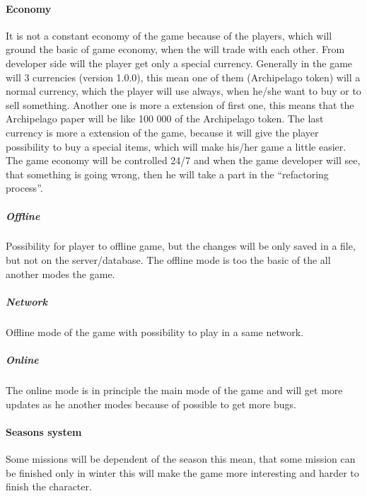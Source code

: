 \documentclass[parskip=full]{scrartcl}
\begin{document}
					\paragraph{Economy} \vspace{-5mm}
							\par \begingroup
							\leftskip=2cm
							\noindent
									It is not a constant economy of the game because of the players, which will ground the basic of game economy, when the will trade with each other. From developer side will the player get only a special currency. Generally in the game will 3 currencies (version 1.0.0), this mean one of them (Archipelago token) will a normal currency, which the player will use always, when he/she want to buy or to sell something. Another one is more a extension of first one, this means that the Archipelago paper will be like 100 000 of the Archipelago token. The last currency is more a extension of the game, because it will give the player possibility to buy a special items, which will make his/her game a little easier. The game economy will be controlled 24/7 and when the game developer will see, that something is going wrong, then he will take a part in the “refactoring process”.
							\par \endgroup
						\subparagraph{Offline} \vspace{-5mm}
							\par \begingroup
							\leftskip=2cm
							\noindent
									Possibility for player to offline game, but the changes will be only saved in a file, but not on the server/database. The offline mode is too the basic of the all another modes the game.
							\par \endgroup
						\subparagraph{Network} \vspace{-5mm}
							\par \begingroup
							\leftskip=2cm
							\noindent
									Offline mode of the game with possibility to play in a same network.
							\par \endgroup
						\subparagraph{Online} \vspace{-5mm}
							\par \begingroup
							\leftskip=2cm
							\noindent
									The online mode is in principle the main mode of the game and will get more updates as he another modes because of possible to get more bugs.
							\par \endgroup
					\paragraph{Seasons system} \vspace{-5mm}
						\par \begingroup
						\leftskip=2cm
						\noindent
								Some missions will be dependent of the season this mean, that some mission can be finished only in winter this will make the game more interesting and harder to finish the character.
						\par \endgroup
\end{document}
